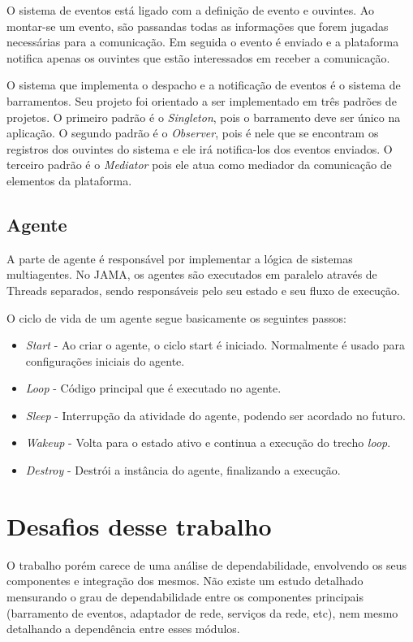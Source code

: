 O sistema de eventos está ligado com a definição de evento e ouvintes. Ao montar-se um evento, são passandas todas as informações que forem jugadas necessárias para a comunicação. Em seguida o evento é enviado e a plataforma notifica apenas os ouvintes que estão interessados em receber a comunicação.

O sistema que implementa o despacho e a notificação de eventos é o sistema de barramentos. Seu projeto foi orientado a ser implementado em três padrões de projetos. O primeiro padrão é o \emph{Singleton}, pois o barramento deve ser único na aplicação. O segundo padrão é o \emph{Observer}, pois é nele que se encontram os registros dos ouvintes do sistema e ele irá notifica-los dos eventos enviados. O terceiro padrão é o \emph{Mediator} pois ele atua como mediador da comunicação de elementos da plataforma.

\subsection{Agente}

A parte de agente é responsável por implementar a lógica de sistemas multiagentes. No JAMA, os agentes são executados em paralelo através de Threads separados, sendo responsáveis pelo seu estado e seu fluxo de execução.

O ciclo de vida de um agente segue basicamente os seguintes passos:

\begin{itemize}
	\item \emph{Start} - Ao criar o agente, o ciclo start é iniciado. Normalmente é usado para configurações iniciais do agente.
	\item \emph{Loop} - Código principal que é executado no agente.
	\item \emph{Sleep} - Interrupção da atividade do agente, podendo ser acordado no futuro.
	\item \emph{Wakeup} - Volta para o estado ativo e continua a execução do trecho \emph{loop}.
	\item \emph{Destroy} - Destrói a instância do agente, finalizando a execução.
\end{itemize}


\section{Desafios desse trabalho}
O trabalho porém carece de uma análise de dependabilidade, envolvendo os seus componentes e integração dos mesmos. Não existe um estudo detalhado mensurando o grau de dependabilidade entre os componentes principais (barramento de eventos, adaptador de rede, serviços da rede, etc), nem mesmo detalhando a dependência entre esses módulos.

